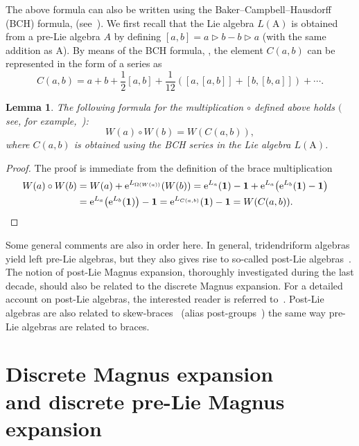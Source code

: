 \documentclass[pdftex]{sigma}
\numberwithin{equation}{section}
\newtheorem{lem}[thm]{Lemma}
\theoremstyle{definition}
\begin{document}
The above formula can also be written using the Baker--Campbell--Hausdorff (BCH) formula, (see~\cite{Chrono, Manchon}). We first recall that the Lie algebra $L({\mathrm A})$ is obtained from a pre-Lie algebra $A$ by defining $[a,b]=a\triangleright b-b\triangleright a$ (with the same addition as ${\mathrm A}$).
By means of the BCH formula, , the element $C(a, b)$ can be represented in the form of a series as
\[
C(a,b)=a+b+{\frac 12}[a,b]+{\frac 1{12}}([a,[a,b]]+[b,[b,a]])+\cdots.
\]

\begin{lem}The following formula for the multiplication $\circ $ defined above holds $($see, for example,~\mbox{\rm \cite{Chrono, Manchon})}:
\[
W(a)\circ W(b)= W(C(a, b)),
\]
where $C(a, b)$ is obtained using the BCH series in the Lie algebra $L({\mathrm A})$.
\end{lem}
\begin{proof} The proof is immediate from the definition of the brace multiplication
\begin{align*}
W(a) \circ W(b) & = W(a) + {\rm e}^{L_{\Omega(W(a))}}(W(b)) = {\rm e}^{L_{a}}({\bf 1})-{\bf 1}
+ {\rm e}^{L_{a}}\bigl({\rm e}^{L_{b}}({\bf 1})-{\bf 1}\bigr)\cr
& = {\rm e}^{L_{a}}\bigl({\rm e}^{L_b}({\bf 1})\bigr)-{\bf 1}={\rm e}^{L_{C(a,b)}}({\bf 1})-{\bf 1} = W(C(a, b)). \nonumber
\tag*{\qed}
\end{align*}
\renewcommand{\qed}{}
\end{proof}

Some general comments are also in order here. In general, tridendriform algebras yield left pre-Lie algebras, but they also gives rise to so-called post-Lie algebras~\cite{p[2], p[3],p[5]}. The notion of post-Lie Magnus expansion, thoroughly investigated during the last decade, should also be related to the discrete Magnus expansion. For a
detailed account on post-Lie algebras, the interested reader is referred to~\cite{p[2], p[3], Ebf}. Post-Lie algebras are also related to skew-braces~\cite{p[4]} (alias post-groups~\cite{p[1]}) the same way pre-Lie algebras are related to braces.

\section[Discrete Magnus expansion and discrete pre-Lie Magnus expansion]{Discrete Magnus expansion\\ and discrete pre-Lie Magnus expansion}\label{section3}
\end{document}
